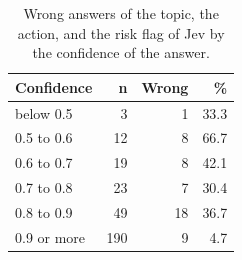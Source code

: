 \begin{table}[t]
\caption{Wrong answers of the topic, the action, and the risk flag of Jev by the confidence of the answer.}
\label{tab:calibration}
\small
\begin{tabular}{lrrr}
\toprule
Confidence & n & Wrong & \% \\
\midrule
below 0.5 & 3 & 1 & 33.3 \\
0.5 to 0.6 & 12 & 8 & 66.7 \\
0.6 to 0.7 & 19 & 8 & 42.1 \\
0.7 to 0.8 & 23 & 7 & 30.4 \\
0.8 to 0.9 & 49 & 18 & 36.7 \\
0.9 or more & 190 & 9 & 4.7 \\
\bottomrule
\end{tabular}
\end{table}
